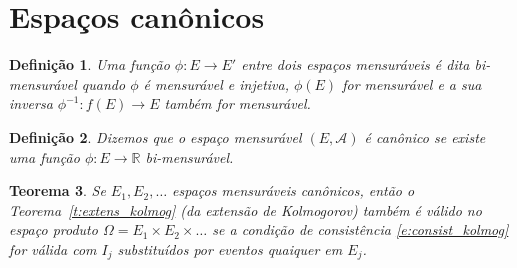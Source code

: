 \documentclass[reqno, final]{book}
\newcommand*\1{\mathds{1}}
\newtheorem{theorem}{Teorema}[section]
\newtheorem{definition}[theorem]{Definição}
\begin{document}
\section{Espaços canônicos}

\begin{definition}
  Uma função $\phi:E \to E'$ entre dois espaços mensuráveis é dita bi-mensurável  quando $\phi$ é mensurável e injetiva, $\phi(E)$ for mensurável e a sua inversa $\phi^{-1}:f(E) \to E$ também for mensurável.
\end{definition}


\begin{definition}
  Dizemos que o espaço mensurável $(E, \mathcal{A})$ é canônico  se existe uma função $\phi: E \to \mathbb{R}$ bi-mensurável.
\end{definition}

\begin{theorem}
  Se $E_1, E_2, \dots$ espaços mensuráveis canônicos, então o Teorema~\ref{t:extens_kolmog} (da extensão de Kolmogorov) também é válido no espaço produto $\Omega = E_1 \times E_2 \times \dots$ se a condição de consistência \eqref{e:consist_kolmog} for válida com $I_j$ substituídos por eventos quaiquer em $E_j$.
\end{theorem}
\end{document}
